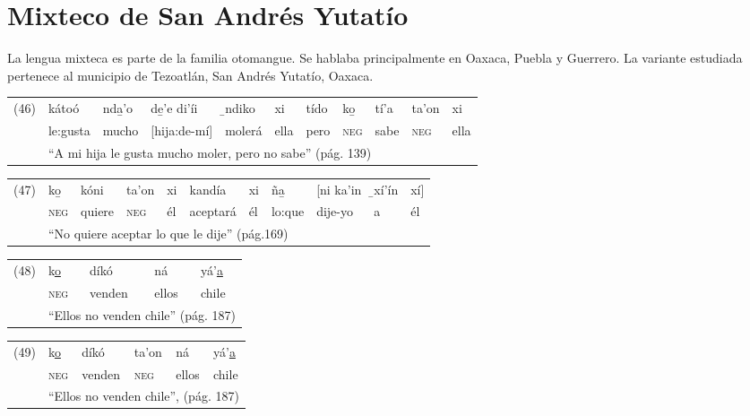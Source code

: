 \section*{Mixteco de San Andrés Yutatío}

\noindent La lengua mixteca es parte de la familia otomangue. Se hablaba principalmente en Oaxaca, Puebla y Guerrero. La variante estudiada pertenece al municipio de Tezoatlán, San Andrés Yutatío, Oaxaca. \vspace{0.3cm}

{\setmainfont{Doulos SIL} 

\begin{tabular}{lllllllllll}
(46) & kátoó & nda̱'o & de̱'e di'íi & ̱ndiko & xi & tído & ko̱ & tí'a & ta'on & xi \\
& le:gusta & mucho & [hija:de-mí] & molerá & ella & pero & \textsc{neg} & sabe & \textsc{neg} & ella \\
& \multicolumn{10}{l}{``A mi hija le gusta mucho moler, pero no sabe'' (pág. 139)}
\end{tabular} \vspace{0.2cm}

\begin{tabular}{lllllllllll}
(47) & ko̱ & kóni & ta'on & xi & kandía & xi & ña̱ & [ni ka'in & ̱xí'ín & xí] \\
& \textsc{neg} & quiere & \textsc{neg} & él & aceptará & él & lo:que & dije-yo & a & él \\
& \multicolumn{10}{l}{``No quiere aceptar lo que le dije'' (pág.169)}
\end{tabular} \vspace{0.2cm}

\begin{tabular}{lllll}
(48) & k\underline{o} & díkó & ná & yá'\underline{a} \\
& \textsc{neg} & venden & ellos & chile \\
& \multicolumn{4}{l}{``Ellos no venden chile'' (pág. 187)}
\end{tabular} \vspace{0.2cm}

\begin{tabular}{llllll}
(49) &  k\underline{o} & díkó & ta'on & ná & yá'\underline{a} \\
& \textsc{neg} & venden & \textsc{neg} & ellos & chile \\
& \multicolumn{5}{l}{``Ellos no venden chile'', (pág. 187)}
\end{tabular} \vspace{0.2cm}

}
